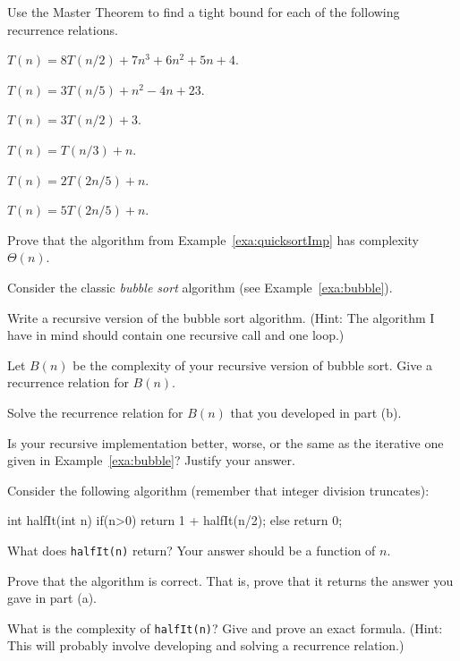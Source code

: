 \begin{pro}
Use the Master Theorem to find a tight bound for each of the following
recurrence relations.
\begin{lenum}
\item $T(n)=8T(n/2)+7n^3+6n^2+5n+4$.
\item $T(n)=3T(n/5)+n^2-4n+23$.
\item $T(n)=3T(n/2)+3$.
\item $T(n)=T(n/3)+n$.
\item $T(n)=2T(2n/5)+n$.
\item $T(n)=5T(2n/5)+n$.
\end{lenum}

\end{pro}

\begin{pro}\label{pro:rpartComp}
Prove that the  algorithm from Example~\ref{exa:quicksortImp} has complexity $\Theta(n)$.
\end{pro}

\begin{pro}
Consider the classic {\em bubble sort} algorithm (see Example~\ref{exa:bubble}).
\begin{lenum}
\item
Write a recursive version of the bubble sort algorithm.
(Hint:  The algorithm I have in mind should contain one recursive call and one loop.)
\item
Let $B(n)$ be the complexity of your recursive version of bubble sort.
Give a recurrence relation for $B(n)$.
\item
Solve the recurrence relation for $B(n)$ that you developed in part (b).
\item
Is your recursive implementation better, worse, or the same as the iterative one given
in Example~\ref{exa:bubble}?  Justify your answer.
\end{lenum}
\end{pro}

\begin{pro}
Consider the following algorithm (remember that integer division truncates):
\begin{code}
    int halfIt(int n) {
        if(n>0) {
            return 1 + halfIt(n/2);
        } else {
            return 0;
        }
    }
\end{code}
\begin{lenum}
\item
What does \verb+halfIt(n)+ return?  Your answer should be a function of $n$.
\item
Prove that the algorithm is correct.  That is, prove that it returns the
answer you gave in part (a).
\item
What is the complexity of \verb+halfIt(n)+? Give and prove an exact formula.
(Hint: This will probably involve developing and solving a recurrence relation.)
\end{lenum}
\end{pro}

